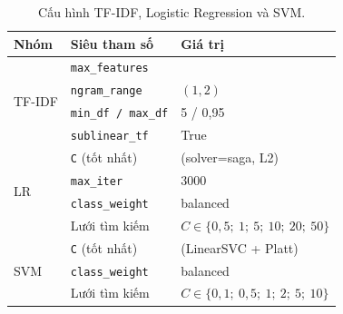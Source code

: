 \begin{table}[H]
  \centering
  \small
  \caption[Cấu hình TF-IDF, LR, SVM]{Cấu hình TF-IDF, Logistic Regression và SVM.}
  \label{tab:appendix_tfidf_lr_svm}
  \begin{tabular}{l l l}
    \toprule
    \textbf{Nhóm} & \textbf{Siêu tham số} & \textbf{Giá trị} \\
    \midrule
    \multirow{4}{*}{TF-IDF}
      & \texttt{max\_features}     & \tfidfmaxfeatures{} \\
      & \texttt{ngram\_range}      & $(1, 2)$ \\
      & \texttt{min\_df / max\_df} & 5 / 0{,}95 \\
      & \texttt{sublinear\_tf}     & True \\
    \midrule
    \multirow{4}{*}{LR}
      & \texttt{C} (tốt nhất)      & \lrbestc{} (solver=saga, L2) \\
      & \texttt{max\_iter}         & 3000 \\
      & \texttt{class\_weight}     & balanced \\
      & Lưới tìm kiếm             & $C \in \{0{,}5;\ 1;\ 5;\ 10;\ 20;\ 50\}$ \\
    \midrule
    \multirow{3}{*}{SVM}
      & \texttt{C} (tốt nhất)      & \svmbestc{} (LinearSVC + Platt) \\
      & \texttt{class\_weight}     & balanced \\
      & Lưới tìm kiếm             & $C \in \{0{,}1;\ 0{,}5;\ 1;\ 2;\ 5;\ 10\}$ \\
    \bottomrule
  \end{tabular}
\end{table}

